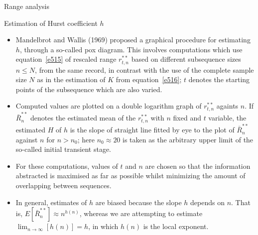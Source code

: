 \documentclass[8pt]{beamer}
\renewcommand{\emph}[1]{\textcolor{myorange}{#1}}
\begin{document}
  \begin{frame}{Range analysis}
      \begin{block}{Estimation of Hurst coefficient $h$}
    \end{block}
    \begin{itemize}
        \item Mandelbrot and Wallis (1969) proposed a graphical procedure for estimating $h$, through a so-called pox diagram. This involves computations which use equation~\ref{e515} of \emph{rescaled range} $r_{t,n}^{**}$ based on different subsequence sizes $n\leq N$, from the same record, in contrast with the use of the complete sample size $N$ as in the estimation of $K$ from equation~\ref{e516}; $t$ denotes the starting points of the subsequence which are also varied.
        \item Computed values are plotted on a double logarithm  graph of $r_{t,n}^{**}$ againts $n$. If $\bar{R}_n^{**}$ denotes the \emph{estimated mean} of the $r_{t,n}^{**}$ with $n$ fixed and $t$ variable, the estimated $H$ of $h$ is the \emph{slope} of straight line fitted by eye to the plot of $\bar{R}_n^{**}$ against $n$ for $n > n_0$; here $n_0 \approx 20$ is taken as the arbitrary upper limit of the so-called initial transient stage.  
        \item For these computations, values of $t$ and $n$ are chosen so that the information abstracted is maximised as far as possible whilst minimizing the amount of overlapping between sequences.
        \item In general, estimates of $h$ are biased because the slope $h$ depends on $n$. That is, $E[\bar{R}_n^{**}] \approx n^{h(n)}$, whereas we are attempting to estimate $\lim_{n\rightarrow \infty} [h(n)] = h$, in which $h(n)$ is the \emph{local exponent}.
    \end{itemize}
\end{frame}
\end{document}
